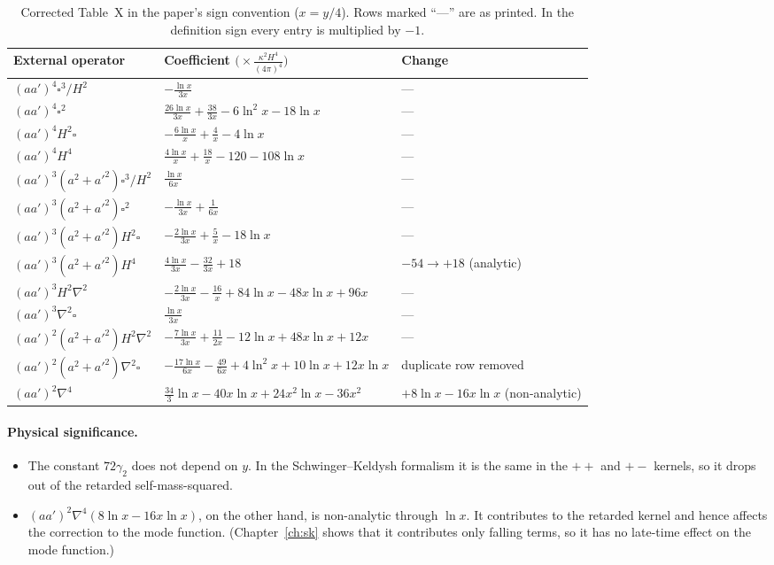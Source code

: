 \begin{table}[ht]
\centering\small
\renewcommand{\arraystretch}{1.45}
\begin{tabular}{lll}
\toprule
External operator & Coefficient $\big(\times\frac{\kappa^2H^4}{(4\pi)^4}\big)$ & Change \\
\midrule
$(aa')^4\square^3/H^2$ & $-\frac{\ln x}{3x}$ & --- \\
$(aa')^4\square^2$ & $\frac{26\ln x}{3x}+\frac{38}{3x}-6\ln^2x-18\ln x$ & --- \\
$(aa')^4H^2\square$ & $-\frac{6\ln x}{x}+\frac4x-4\ln x$ & --- \\
$(aa')^4H^4$ & $\frac{4\ln x}{x}+\frac{18}x-120-108\ln x$ & --- \\
$(aa')^3(a^2+a'^2)\square^3/H^2$ & $\frac{\ln x}{6x}$ & --- \\
$(aa')^3(a^2+a'^2)\square^2$ & $-\frac{\ln x}{3x}+\frac1{6x}$ & --- \\
$(aa')^3(a^2+a'^2)H^2\square$ & $-\frac{2\ln x}{3x}+\frac5x-18\ln x$ & --- \\
$(aa')^3(a^2+a'^2)H^4$ & $\frac{4\ln x}{3x}-\frac{32}{3x}+18$ & $-54\to+18$ (analytic) \\
$(aa')^3H^2\nabla^2$ & $-\frac{2\ln x}{3x}-\frac{16}x+84\ln x-48x\ln x+96x$ & --- \\
$(aa')^3\nabla^2\square$ & $\frac{\ln x}{3x}$ & --- \\
$(aa')^2(a^2+a'^2)H^2\nabla^2$ & $-\frac{7\ln x}{3x}+\frac{11}{2x}-12\ln x+48x\ln x+12x$ & --- \\
$(aa')^2(a^2+a'^2)\nabla^2\square$ & $-\frac{17\ln x}{6x}-\frac{49}{6x}+4\ln^2x+10\ln x+12x\ln x$ & duplicate row removed \\
$(aa')^2\nabla^4$ & $\frac{34}3\ln x-40x\ln x+24x^2\ln x-36x^2$ & $+8\ln x-16x\ln x$ (non-analytic) \\
\bottomrule
\end{tabular}
\caption{Corrected Table~X in the paper's sign convention ($x=y/4$). Rows marked ``---'' are as printed. In the definition sign every entry is multiplied by $-1$.}
\label{tab:ch08-TXcorr}
\end{table}

\paragraph{Physical significance.} \tA
\begin{itemize}[leftmargin=*,itemsep=2pt]
\item The constant $72\gamma_2$ does not depend on $y$. In the Schwinger--Keldysh formalism it is the same in the $++$ and $+-$ kernels, so it drops out of the retarded self-mass-squared.
\item $(aa')^2\nabla^4(8\ln x-16x\ln x)$, on the other hand, is non-analytic through $\ln x$. It contributes to the retarded kernel and hence affects the correction to the mode function.
(Chapter~\ref{ch:sk} shows that it contributes only falling terms, so it has no late-time effect on the mode function.)
\end{itemize}

